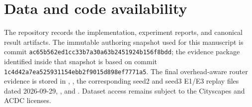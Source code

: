 \documentclass[a4paper,review,12pt]{elsarticle}
\begin{document}
\section*{Data and code availability}

The repository records the implementation, experiment reports, and canonical result artifacts. The immutable authoring snapshot used for this manuscript is commit \texttt{ac65b562ed1cc33b7a30a63b2451924b156f8bdd}; the evidence package identified inside that snapshot is based on commit \texttt{1c4d42a7ea525931154ebb2f9015d898ef7771a5}. The final overhead-aware router evidence is stored in , , the corresponding seed2 and seed3 E1/E3 replay files dated 2026-09-29, , and . Dataset access remains subject to the Cityscapes and ACDC licenses.
\end{document}
